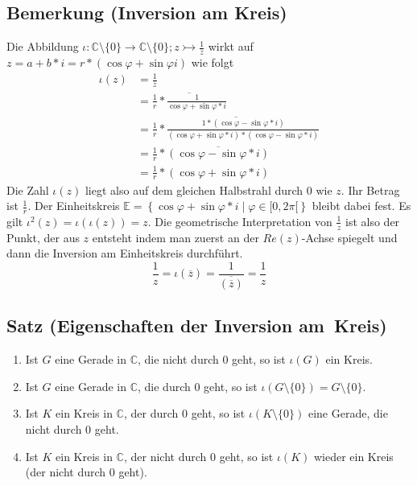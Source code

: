 \subsection{Bemerkung (Inversion am Kreis)}
Die Abbildung $\iota: \mathbb{C} \setminus \{0\} \rightarrow \mathbb{C} \setminus \{0\}; z \rightarrowtail \frac{1}{\overline{z}}$
wirkt auf $z = a+b*i = r*(\cos{\varphi} + \sin{\varphi} i)$ wie folgt
\begin{align*}
\iota(z) &= \frac{1}{\overline{z}} \\
 &= \overline{\frac{1}{r} * \frac{1}{\cos{\varphi}+\sin{\varphi}*i}} \\
 &= \overline{\frac{1}{r} * \frac{1 * (\cos{\varphi}-\sin{\varphi}*i)}{(\cos{\varphi}+\sin{\varphi}*i)*(\cos{\varphi}-\sin{\varphi}*i)}} \\
 &= \frac{1}{r} * \overline{(\cos{\varphi}-\sin{\varphi}*i)} \\
 &= \frac{1}{r} * (\cos{\varphi}+\sin{\varphi}*i)
\end{align*}
Die Zahl $\iota(z)$ liegt also auf dem gleichen Halbstrahl durch 0 wie $z$.
Ihr Betrag ist $\frac{1}{r}$.
Der Einheitskreis $\mathbb{E} = \left\{ \cos{\varphi} + \sin{\varphi}*i \middle| \varphi \in [0, 2\pi[ \right\}$ bleibt dabei fest.
Es gilt $\iota^2(z) = \iota(\iota(z)) = z$.
Die geometrische Interpretation von $\frac{1}{z}$ ist also der Punkt, der aus $z$ entsteht indem man zuerst an der $Re(z)$-Achse spiegelt und dann die Inversion am Einheitskreis durchführt.
\[\frac{1}{z} = \iota (\overline{z}) = \frac{1}{\overline{(\overline{z})}} = \frac{1}{z}\]

\subsection{Satz (Eigenschaften der Inversion am Kreis)}
\begin{enumerate}
\item Ist $G$ eine Gerade in $\mathbb{C}$, die nicht durch 0 geht, so ist $\iota(G)$ ein Kreis.
\item Ist $G$ eine Gerade in $\mathbb{C}$, die durch 0 geht, so ist $\iota(G \setminus \{0\}) = G \setminus \{0\}$.
\item Ist $K$ ein Kreis in $\mathbb{C}$, der durch 0 geht, so ist $\iota(K \setminus \{0\})$ eine Gerade, die nicht durch 0 geht.
\item Ist $K$ ein Kreis in $\mathbb{C}$, der nicht durch 0 geht, so ist $\iota(K)$ wieder ein Kreis (der nicht durch 0 geht).
\end{enumerate}


